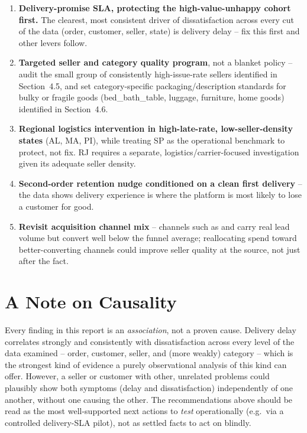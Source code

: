 \documentclass[11pt,a4paper]{report}
\begin{document}
\begin{enumerate}[leftmargin=2em]
    \item \textbf{Delivery-promise SLA, protecting the high-value-unhappy cohort first.} The
        clearest, most consistent driver of dissatisfaction across every cut of the data (order,
        customer, seller, state) is delivery delay -- fix this first and other levers follow.
    \item \textbf{Targeted seller and category quality program}, not a blanket policy -- audit the
        small group of consistently high-issue-rate sellers identified in Section~4.5, and set
        category-specific packaging/description standards for bulky or fragile goods
        (bed_bath_table, luggage, furniture, home goods) identified in Section~4.6.
    \item \textbf{Regional logistics intervention in high-late-rate, low-seller-density states}
        (AL, MA, PI), while treating SP as the operational benchmark to protect, not fix. RJ
        requires a separate, logistics/carrier-focused investigation given its adequate seller
        density.
    \item \textbf{Second-order retention nudge conditioned on a clean first delivery} -- the data
        shows delivery experience is where the platform is most likely to lose a customer for
        good.
    \item \textbf{Revisit acquisition channel mix} -- channels such as  and
         carry real lead volume but convert well below the funnel average;
        reallocating spend toward better-converting channels could improve seller quality at the
        source, not just after the fact.
\end{enumerate}

\section*{A Note on Causality}
Every finding in this report is an \textit{association}, not a proven cause. Delivery delay
correlates strongly and consistently with dissatisfaction across every level of the data examined
-- order, customer, seller, and (more weakly) category -- which is the strongest kind of evidence a
purely observational analysis of this kind can offer. However, a seller or customer with other,
unrelated problems could plausibly show both symptoms (delay and dissatisfaction) independently of
one another, without one causing the other. The recommendations above should be read as the
most well-supported next actions to \emph{test} operationally (e.g.\ via a controlled delivery-SLA
pilot), not as settled facts to act on blindly.
\end{document}
